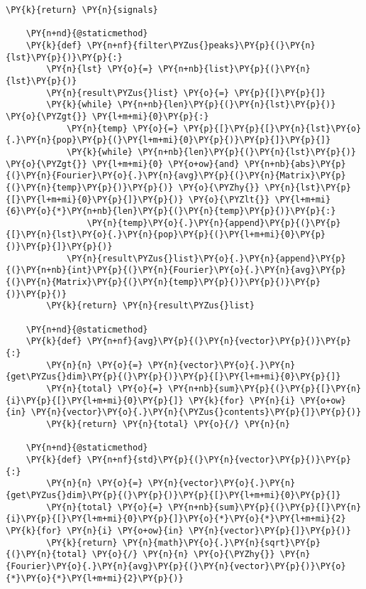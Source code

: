 \begin{Verbatim}[commandchars=\\\{\}]
        \PY{k}{return} \PY{n}{signals}
    
    \PY{n+nd}{@staticmethod}
    \PY{k}{def} \PY{n+nf}{filter\PYZus{}peaks}\PY{p}{(}\PY{n}{lst}\PY{p}{)}\PY{p}{:}
        \PY{n}{lst} \PY{o}{=} \PY{n+nb}{list}\PY{p}{(}\PY{n}{lst}\PY{p}{)}
        \PY{n}{result\PYZus{}list} \PY{o}{=} \PY{p}{[}\PY{p}{]}
        \PY{k}{while} \PY{n+nb}{len}\PY{p}{(}\PY{n}{lst}\PY{p}{)} \PY{o}{\PYZgt{}} \PY{l+m+mi}{0}\PY{p}{:}
            \PY{n}{temp} \PY{o}{=} \PY{p}{[}\PY{p}{[}\PY{n}{lst}\PY{o}{.}\PY{n}{pop}\PY{p}{(}\PY{l+m+mi}{0}\PY{p}{)}\PY{p}{]}\PY{p}{]}
            \PY{k}{while} \PY{n+nb}{len}\PY{p}{(}\PY{n}{lst}\PY{p}{)} \PY{o}{\PYZgt{}} \PY{l+m+mi}{0} \PY{o+ow}{and} \PY{n+nb}{abs}\PY{p}{(}\PY{n}{Fourier}\PY{o}{.}\PY{n}{avg}\PY{p}{(}\PY{n}{Matrix}\PY{p}{(}\PY{n}{temp}\PY{p}{)}\PY{p}{)} \PY{o}{\PYZhy{}} \PY{n}{lst}\PY{p}{[}\PY{l+m+mi}{0}\PY{p}{]}\PY{p}{)} \PY{o}{\PYZlt{}} \PY{l+m+mi}{6}\PY{o}{*}\PY{n+nb}{len}\PY{p}{(}\PY{n}{temp}\PY{p}{)}\PY{p}{:}
                \PY{n}{temp}\PY{o}{.}\PY{n}{append}\PY{p}{(}\PY{p}{[}\PY{n}{lst}\PY{o}{.}\PY{n}{pop}\PY{p}{(}\PY{l+m+mi}{0}\PY{p}{)}\PY{p}{]}\PY{p}{)}
            \PY{n}{result\PYZus{}list}\PY{o}{.}\PY{n}{append}\PY{p}{(}\PY{n+nb}{int}\PY{p}{(}\PY{n}{Fourier}\PY{o}{.}\PY{n}{avg}\PY{p}{(}\PY{n}{Matrix}\PY{p}{(}\PY{n}{temp}\PY{p}{)}\PY{p}{)}\PY{p}{)}\PY{p}{)}
        \PY{k}{return} \PY{n}{result\PYZus{}list}
        
    \PY{n+nd}{@staticmethod}
    \PY{k}{def} \PY{n+nf}{avg}\PY{p}{(}\PY{n}{vector}\PY{p}{)}\PY{p}{:}
        \PY{n}{n} \PY{o}{=} \PY{n}{vector}\PY{o}{.}\PY{n}{get\PYZus{}dim}\PY{p}{(}\PY{p}{)}\PY{p}{[}\PY{l+m+mi}{0}\PY{p}{]}
        \PY{n}{total} \PY{o}{=} \PY{n+nb}{sum}\PY{p}{(}\PY{p}{[}\PY{n}{i}\PY{p}{[}\PY{l+m+mi}{0}\PY{p}{]} \PY{k}{for} \PY{n}{i} \PY{o+ow}{in} \PY{n}{vector}\PY{o}{.}\PY{n}{\PYZus{}contents}\PY{p}{]}\PY{p}{)}
        \PY{k}{return} \PY{n}{total} \PY{o}{/} \PY{n}{n}
    
    \PY{n+nd}{@staticmethod}
    \PY{k}{def} \PY{n+nf}{std}\PY{p}{(}\PY{n}{vector}\PY{p}{)}\PY{p}{:}
        \PY{n}{n} \PY{o}{=} \PY{n}{vector}\PY{o}{.}\PY{n}{get\PYZus{}dim}\PY{p}{(}\PY{p}{)}\PY{p}{[}\PY{l+m+mi}{0}\PY{p}{]}
        \PY{n}{total} \PY{o}{=} \PY{n+nb}{sum}\PY{p}{(}\PY{p}{[}\PY{n}{i}\PY{p}{[}\PY{l+m+mi}{0}\PY{p}{]}\PY{o}{*}\PY{o}{*}\PY{l+m+mi}{2} \PY{k}{for} \PY{n}{i} \PY{o+ow}{in} \PY{n}{vector}\PY{p}{]}\PY{p}{)}
        \PY{k}{return} \PY{n}{math}\PY{o}{.}\PY{n}{sqrt}\PY{p}{(}\PY{n}{total} \PY{o}{/} \PY{n}{n} \PY{o}{\PYZhy{}} \PY{n}{Fourier}\PY{o}{.}\PY{n}{avg}\PY{p}{(}\PY{n}{vector}\PY{p}{)}\PY{o}{*}\PY{o}{*}\PY{l+m+mi}{2}\PY{p}{)}


\end{Verbatim}
